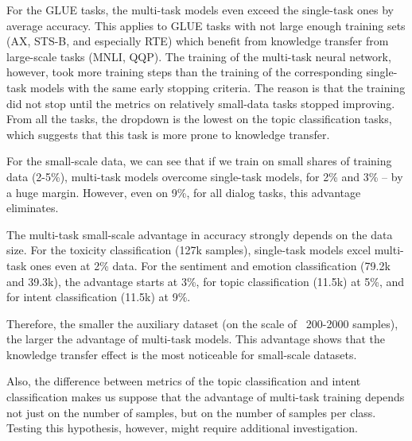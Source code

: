 \begin{itemize}
For the GLUE tasks, the multi-task models even exceed the single-task ones by average accuracy. This applies to GLUE tasks with not large enough training sets (AX, STS-B, and especially RTE) which benefit from knowledge transfer from large-scale tasks (MNLI, QQP).
The training of the multi-task neural network, however, took more training steps than the training of the corresponding single-task models with the same early stopping criteria. The reason is that the training did not stop until the metrics on relatively small-data tasks stopped improving. 
From all the tasks, the dropdown is the lowest on the topic classification tasks, which suggests that this task is more prone to knowledge transfer.

For the small-scale data, we can see that if we train on small shares of training data (2-5\%), multi-task models overcome single-task models, for 2\% and 3\% -- by a huge margin. However, even on 9\%, for all dialog tasks, this advantage eliminates.

The multi-task small-scale advantage in accuracy strongly depends on the data size. For the toxicity classification (127k samples), single-task models excel multi-task ones even at 2\% data. For the sentiment and emotion classification (79.2k and 39.3k), the advantage starts at 3\%, for topic classification (11.5k) at 5\%, and for intent classification (11.5k) at 9\%. 

Therefore, the smaller the auxiliary dataset (on the scale of ~200-2000 samples), the larger the advantage of multi-task models. This advantage shows that the knowledge transfer effect is the most noticeable for small-scale datasets.

Also, the difference between metrics of the topic classification and intent classification makes us suppose that the advantage of multi-task training depends not just on the number of samples, but on the number of samples per class. Testing this hypothesis, however, might require additional investigation. 


\end{itemize}
